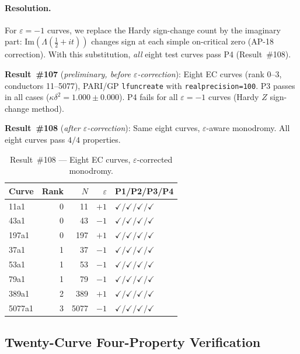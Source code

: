 \documentclass[11pt, a4paper]{article}
\theoremstyle{plain}
\theoremstyle{definition}
\begin{document}
\paragraph{Resolution.}
For $\varepsilon=-1$ curves, we replace the Hardy sign-change count
by the imaginary part: $\mathrm{Im}(\Lambda(\tfrac{1}{2}+it))$ changes
sign at each simple on-critical zero (AP-18 correction).  With this
substitution, \textit{all} eight test curves pass P4 (Result~\#108).

\medskip
\noindent
\textbf{Result~\#107} (\textit{preliminary, before $\varepsilon$-correction}):
Eight EC curves (rank 0--3, conductors 11--5077), PARI/GP \texttt{lfuncreate}
with \texttt{realprecision=100}.  P3 passes in all cases
($\kappa\delta^{2}=1.000\pm0.000$).  P4 fails for all $\varepsilon=-1$
curves (Hardy $Z$ sign-change method).

\medskip
\noindent
\textbf{Result~\#108} (\textit{after $\varepsilon$-correction}):
Same eight curves, $\varepsilon$-aware monodromy.  All eight curves pass
$4/4$ properties.

\begin{table}[ht]
\centering
\caption{Result~\#108 — Eight EC curves, $\varepsilon$-corrected monodromy.}
\label{tab:ec108}
\small
\begin{tabular}{lrrrl}
\toprule
Curve & Rank & $N$ & $\varepsilon$ & P1/P2/P3/P4 \\
\midrule
11a1  & 0 & 11   & $+1$ & $\checkmark/\checkmark/\checkmark/\checkmark$ \\
43a1  & 0 & 43   & $-1$ & $\checkmark/\checkmark/\checkmark/\checkmark$ \\
197a1 & 0 & 197  & $+1$ & $\checkmark/\checkmark/\checkmark/\checkmark$ \\
37a1  & 1 & 37   & $-1$ & $\checkmark/\checkmark/\checkmark/\checkmark$ \\
53a1  & 1 & 53   & $-1$ & $\checkmark/\checkmark/\checkmark/\checkmark$ \\
79a1  & 1 & 79   & $-1$ & $\checkmark/\checkmark/\checkmark/\checkmark$ \\
389a1 & 2 & 389  & $+1$ & $\checkmark/\checkmark/\checkmark/\checkmark$ \\
5077a1& 3 & 5077 & $-1$ & $\checkmark/\checkmark/\checkmark/\checkmark$ \\
\bottomrule
\end{tabular}
\end{table}


\subsection{Twenty-Curve Four-Property Verification}
\label{ssec:20curve}
\end{document}
